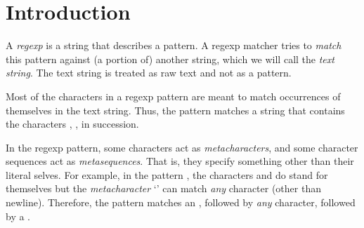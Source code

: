 \section{Introduction}

A {\em regexp} is a string that describes a pattern.  A
regexp matcher tries to {\em match} this pattern
against (a portion of) another string, which we
will call the {\em text string}.  The text string
is treated as raw text and not as a pattern.

Most of the characters in a regexp pattern are meant to
match occurrences of themselves in the text string.
Thus, the pattern  matches a string that
contains the characters , ,  in succession.

In the regexp pattern, some characters  act as {\em
metacharacters}, and some character sequences act as
{\em metasequences}.  That is, they specify something
other than their literal selves.  For example, in the
pattern , the characters  and  do
stand for themselves but the {\em metacharacter} `'
can match {\em any} character (other than
newline).  Therefore, the pattern 
matches an , followed by {\em any} character,
followed by a .

